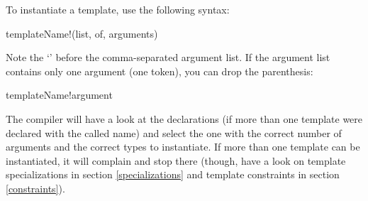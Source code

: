 To instantiate a template, use the following syntax:

\begin{dcode}
templateName!(list, of, arguments)
\end{dcode}


Note the `\DD{!}' before the comma-separated argument list. If the argument list contains only one argument (one token), you can drop the parenthesis:

\begin{dcode}
templateName!argument
\end{dcode}



The compiler will have a look at the declarations (if more than one template were declared with the called name) and select the one with the correct number of arguments and the correct types to instantiate. If more than one template can be instantiated, it will complain  and stop there (though, have a look on template specializations in section \ref{specializations} and template constraints in section \ref{constraints}).

